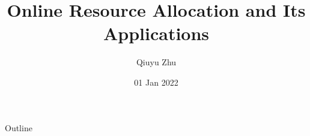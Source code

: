 \documentclass[english,11pt,aspectratio=1610,xcolor=table]{beamer}
\title{
    Online Resource Allocation and Its Applications}
\author
    [Qiuyu Zhu]
    {Qiuyu Zhu}
\institute
    [\hypersetup{urlcolor=jdgrey}%
      \href{https://iora.nus.edu.sg/}{IORA} %
    ]
    {Institute of Operations Research and Analytics\\%
     National University of Singapore}
\date
    [01/2022]
    {01 Jan 2022}
\begin{document}
\maketitle

\begin{frame}{Outline}
    \tableofcontents
\end{frame}




\end{document}
